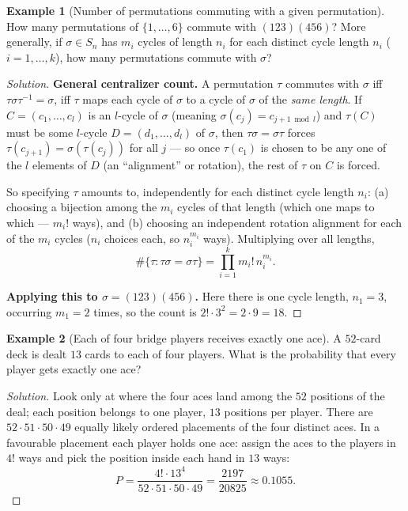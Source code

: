 \documentclass[11pt]{article}
\theoremstyle{definition}
\newtheorem{example}{Example}[section]
\begin{document}
\begin{example}[Number of permutations commuting with a given permutation]
How many permutations of $\{1,\dots,6\}$ commute with $(123)(456)$? More generally, if $\sigma\in S_n$ has $m_i$ cycles of length $n_i$ for each distinct cycle length $n_i$ ($i=1,\dots,k$), how many permutations commute with $\sigma$?
\end{example}
\begin{proof}[Solution]
\textbf{General centralizer count.} A permutation $\tau$ commutes with $\sigma$ iff $\tau\sigma\tau^{-1}=\sigma$, iff $\tau$ maps each cycle of $\sigma$ to a cycle of $\sigma$ of the \emph{same length}. If $C=(c_1,\dots,c_l)$ is an $l$-cycle of $\sigma$ (meaning $\sigma(c_j)=c_{j+1\bmod l}$) and $\tau(C)$ must be some $l$-cycle $D=(d_1,\dots,d_l)$ of $\sigma$, then $\tau\sigma=\sigma\tau$ forces $\tau(c_{j+1})=\sigma(\tau(c_j))$ for all $j$ — so once $\tau(c_1)$ is chosen to be any one of the $l$ elements of $D$ (an ``alignment'' or rotation), the rest of $\tau$ on $C$ is forced.

So specifying $\tau$ amounts to, independently for each distinct cycle length $n_i$: (a) choosing a bijection among the $m_i$ cycles of that length (which one maps to which — $m_i!$ ways), and (b) choosing an independent rotation alignment for each of the $m_i$ cycles ($n_i$ choices each, so $n_i^{m_i}$ ways). Multiplying over all lengths,
\[
\boxed{\#\{\tau:\tau\sigma=\sigma\tau\}=\prod_{i=1}^km_i!\,n_i^{m_i}}.
\]

\textbf{Applying this to $\sigma=(123)(456)$.} Here there is one cycle length, $n_1=3$, occurring $m_1=2$ times, so the count is $2!\cdot3^2=2\cdot9=\boxed{18}$.
\end{proof}

\begin{example}[Each of four bridge players receives exactly one ace]
A $52$-card deck is dealt $13$ cards to each of four players. What is the probability that every player gets exactly one ace?
\end{example}

\begin{proof}[Solution]
Look only at where the four aces land among the $52$ positions of the deal; each position belongs to one player, $13$ positions per player. There are $52\cdot51\cdot50\cdot49$ equally likely ordered placements of the four distinct aces. In a favourable placement each player holds one ace: assign the aces to the players in $4!$ ways and pick the position inside each hand in $13$ ways:
\[
P=\frac{4!\cdot13^4}{52\cdot51\cdot50\cdot49}=\boxed{\frac{2197}{20825}\approx0.1055}.
\]
\end{proof}
\end{document}
